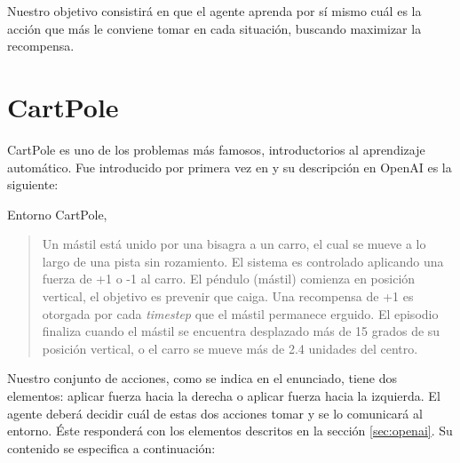 Nuestro objetivo consistirá en que el agente aprenda por sí mismo cuál es la acción que más le conviene tomar en cada situación, buscando maximizar la recompensa.


\section{CartPole}
\label{cartpole-sec}

CartPole es uno de los problemas más famosos, introductorios al aprendizaje automático. Fue introducido por primera vez en \citet{BartoSA83} y su descripción en OpenAI es la siguiente:

%
       {Entorno CartPole, \citet{BartoSA83}}

\begin{quote}
    Un mástil está unido por una bisagra a un carro, el cual se mueve a lo largo de una pista sin rozamiento. El sistema es controlado aplicando una fuerza de +1 o -1 al carro. El péndulo (mástil) comienza en posición vertical, el objetivo es prevenir que caiga. Una recompensa de +1 es otorgada por cada \textit{timestep} que el mástil permanece erguido. El episodio finaliza cuando el mástil se encuentra desplazado más de 15 grados de su posición vertical, o el carro se mueve más de 2.4 unidades del centro.
\end{quote}

Nuestro conjunto de acciones, como se indica en el enunciado, tiene dos elementos: aplicar fuerza hacia la derecha o aplicar fuerza hacia la izquierda. El agente deberá decidir cuál de estas dos acciones tomar y se lo comunicará al entorno. Éste responderá con los elementos descritos en la sección \ref{sec:openai}. Su contenido se especifica a continuación:

